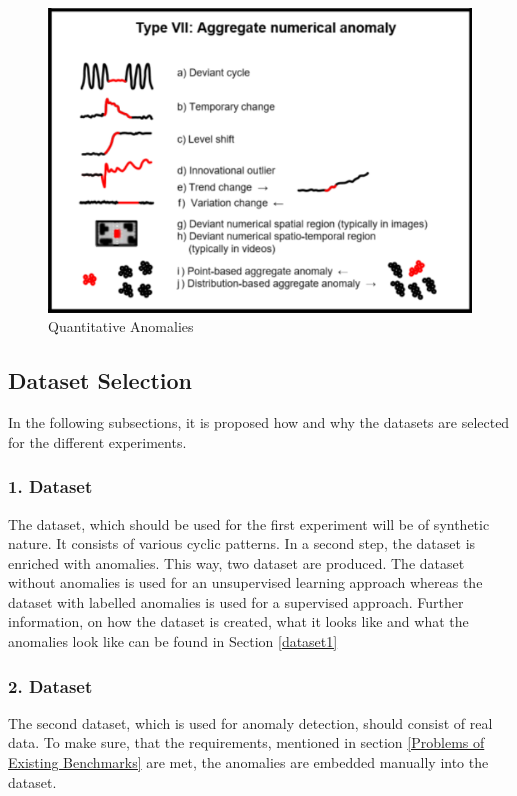 \begin{figure}[h]
	\centering
	\includegraphics[scale=0.6]{Figures/series_anomaly}
	\decoRule
	\caption[Quantitative Anomalies]{Quantitative Anomalies \parencite{Foorthuis}}
	\label{fig:Anomaly_types}
\end{figure}

\subsection{Dataset Selection}
In the following subsections, it is proposed how and why the datasets are selected for the different experiments.

\subsubsection{1. Dataset}
The dataset, which should be used for the first experiment will be of synthetic nature. It consists of various cyclic patterns. In a second step, the dataset is enriched with anomalies. This way, two dataset are produced. The dataset without anomalies is used for an unsupervised learning approach whereas the dataset with labelled anomalies is used for a supervised approach. Further information, on how the dataset is created, what it looks like and what the anomalies look like can be found in Section \ref{dataset1} 

\subsubsection{2. Dataset}
The second dataset, which is used for anomaly detection, should consist of real data. To make sure, that the requirements, mentioned in section \ref{Problems of Existing Benchmarks} are met, the anomalies are embedded manually into the dataset. 

